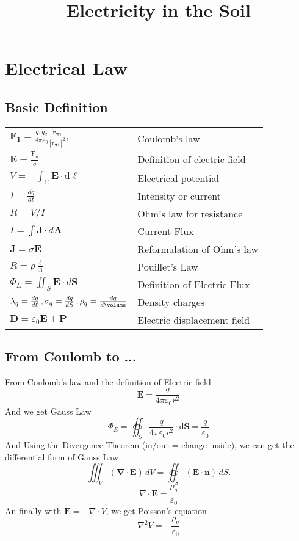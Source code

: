\documentclass[twocolumn]{article}
\title{Electricity in the Soil}
\date{\vspace{-6ex}}
\numberwithin{equation}{section}
\begin{document}
\maketitle




\newpage
\section{Electrical Law}	

	\subsection{Basic Definition}
\begin{tabular}{@{}ll@{}}
$\boldsymbol{F_1}=\frac{q_1q_2}{4\pi\varepsilon_0} \frac{\boldsymbol{\hat{r}_{21}}}{ |\boldsymbol{r_{21}}|^2}, $ & Coulomb's law\\
$\mathbf{E}\equiv \frac{\mathbf{F}_{q}}{q}$ & Definition of electric field\\
$V = - \int_C \mathbf{E} \cdot \mathrm{d} \boldsymbol{\ell} \, $ & Electrical potential \\
$I = \frac{dq}{dt}$ & Intensity or current\\
$R = V/I$  & Ohm's law for resistance \\
$I=\int\mathbf{J}\cdot d\mathbf{A}$ & Current Flux\\
$\mathbf{J} = \sigma \mathbf{E}$ & Reformulation of Ohm's law \\
$R = \rho \frac{\ell}{A}$ & Pouillet's Law\\
$\Phi_E = \iint_S \mathbf{E} \cdot d\mathbf{S}$ & Definition of Electric Flux \\
$\lambda_q = \frac{d q}{d \ell}\,, \sigma_q = \frac{d q}{d S}\,, \rho_q =\frac{d q}{d \volume}$ & Density charges \\
$  \boldsymbol{D} = \varepsilon_0  \boldsymbol{E} +  \boldsymbol{P} $ & Electric displacement field \\
\end{tabular}

	\subsection{From Coulomb to ...}
From Coulomb's law and the definition of Electric field
\[ \mathbf{E} = \frac{q}{4\pi\varepsilon_0 r^2}  \] 
And we get Gauss Law
\[ \Phi_E = \oiint_S \frac{q}{4\pi\varepsilon_0 r^2} \cdot \mathrm{d}\mathbf{S} = \frac{q}{\varepsilon_0}\]
And Using the Divergence Theorem (in/out = change inside), we can get the differential form of Gauss Law
\[ \iiint_V\left(\mathbf{\nabla}\cdot\mathbf{E}\right)\,dV=\oiint_S(\mathbf{E}\cdot\mathbf{n})\,dS .\]
\[\nabla \cdot \mathbf{E} = \frac{\rho_q}{\varepsilon_0}\]
An finally with $\mathbf{E} = -\nabla \cdot V$, we get Poisson's equation
 \[ {\nabla}^2 V = -\frac{\rho_q}{\varepsilon_0} \]
\end{document}
